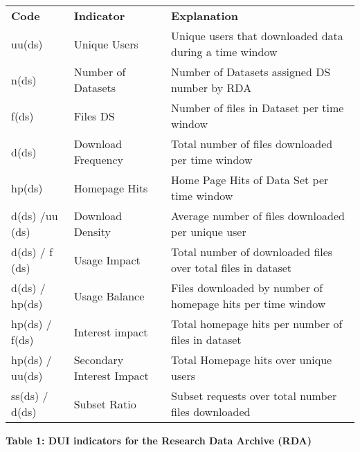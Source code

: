 \begin{table}[h]
\begin{tabular}{lll}
\textbf{Code}   & \textbf{Indicator}        & \textbf{Explanation}                                         \\
uu(ds)          & Unique Users              & Unique users that downloaded data during a time window       \\
n(ds)           & Number of Datasets        & Number of Datasets assigned DS number by RDA                 \\
f(ds)           & Files DS                  & Number of files in Dataset per time window                   \\
d(ds)           & Download Frequency        & Total number of files downloaded per time window             \\
hp(ds)          & Homepage Hits             & Home Page Hits of Data Set per time window                   \\
d(ds) /uu (ds)  & Download Density          & Average number of files downloaded per unique user           \\
d(ds) / f (ds)  & Usage Impact              & Total number of downloaded files over total files in dataset \\
d(ds) / hp(ds)  & Usage Balance             & Files downloaded by number of homepage hits per time window  \\
hp(ds) / f(ds)  & Interest impact           & Total homepage hits per number of files in dataset           \\
hp(ds) / uu(ds) & Secondary Interest Impact & Total Homepage hits over unique users                        \\
ss(ds) / d(ds)  & Subset Ratio              & Subset requests over total number files downloaded          
\end{tabular}
\end{table}
\textbf{Table 1: DUI indicators for the Research Data Archive (RDA)}